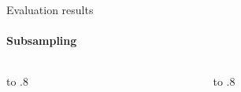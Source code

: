 \documentclass[aspectratio=169]{beamer}
\begin{document}
\begin{frame}{Evaluation results}
\framesubtitle{Subsampling}
\begin{columns}[T]
    \begin{column}{0.8\textwidth}\vbox to .8\end{column}
    \begin{column}{0.2\textwidth}\vbox to .8\end{column}
    \end{columns}
\end{frame}
\end{document}
